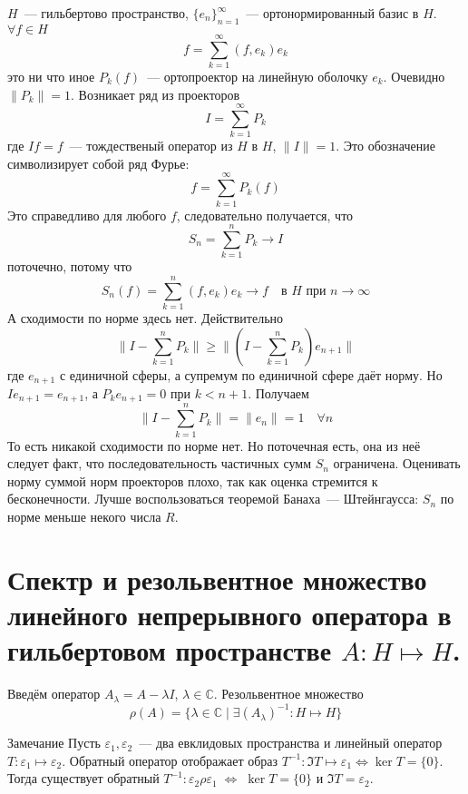 \documentclass[14pt]{extarticle}
\begin{document}
\begin{Prim}
    $H$~--- гильбертово пространство, $\{e_n\}_{n = 1}^{\infty}$~--- ортонормированный базис в $H$.
    $\forall f \in H$
    $$
     f = \sum\limits_{k = 1}^{\infty}(f, e_k)e_k
    $$ 
    это ни что иное $P_k(f)$~--- ортопроектор на линейную оболочку $e_k$.
    Очевидно $\|P_k\| = 1$.
    Возникает ряд из проекторов 
    $$
    I = \sum\limits_{k = 1}^{\infty}P_k
    $$
    где $If = f$~--- тождественый оператор из $H$ в $H$, $\|I\| = 1$.
    Это обозначение символизирует собой ряд Фурье:
    $$
    f = \sum\limits_{k = 1}^{\infty}P_k(f)
    $$
    Это справедливо для любого $f$, следовательно получается, что 
    $$
    S_n = \sum\limits_{k = 1}^{n}P_k \to I
    $$ поточечно, потому что
    $$
    S_n(f) = \sum\limits_{k = 1}^{n}(f, e_k)e_k \to f \quad \text{в }H \text{ при } n \to \infty
    $$
    А сходимости по норме здесь нет.
    Действительно 
    $$
    \|I - \sum\limits_{k = 1}^{n}P_k\| \ge \|(I - \sum\limits_{k = 1}^{n}P_k)e_{n + 1}\|
    $$
    где $e_{n+  1}$ с единичной сферы, а супремум по единичной сфере даёт норму.
    Но $Ie_{n + 1} = e_{n + 1}$, а $P_k e_{n + 1} = 0$ при $k < n + 1$.
    Получаем 
    $$
    \|I - \sum\limits_{k = 1}^{n}P_k\| = \|e_n\| = 1\quad \forall n
    $$
    То есть никакой сходимости по норме нет.
    Но поточечная есть, она из неё следует факт, что последовательность частичных сумм $S_n$ ограничена.
    Оценивать норму суммой норм проекторов плохо, так как оценка стремится к бесконечности.
    Лучше воспользоваться теоремой Банаха~--- Штейнгаусса: $S_n$ по норме меньше некого числа $R$.
\end{Prim}

\section*{Спектр и резольвентное множество линейного непрерывного оператора в гильбертовом пространстве $A : H \mapsto H$.}

Введём оператор $A_\lambda = A - \lambda I$, $\lambda \in \mathbb C$.
Резольвентное множество 
$$
\rho(A) = \{\lambda \in \mathbb C \mid \exists (A_\lambda)^{-1} : H \mapsto H\}
$$

\begin{MathCl}{Замечание}
    Пусть $\varepsilon_1, \varepsilon_2$~--- два евклидовых пространства и линейный оператор $T : \varepsilon_1 \mapsto \varepsilon_2$.
    Обратный оператор отображает образ $T^{-1} : \Im T \mapsto \varepsilon_1 \Leftrightarrow \ker T = \{0\}$.
    Тогда существует обратный $T^{-1}:\varepsilon_2 \rho \varepsilon_1\; \Leftrightarrow\; \ker T = \{0\}$ и $\Im T = \varepsilon_2$.
\end{MathCl}
\end{document}
